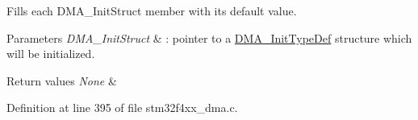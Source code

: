 Fills each D\-M\-A\-\_\-\-Init\-Struct member with its default value. 


\begin{DoxyParams}{Parameters}
{\em D\-M\-A\-\_\-\-Init\-Struct} & \-: pointer to a \hyperlink{struct_d_m_a___init_type_def}{D\-M\-A\-\_\-\-Init\-Type\-Def} structure which will be initialized. \\
\hline
\end{DoxyParams}

\begin{DoxyRetVals}{Return values}
{\em None} & \\
\hline
\end{DoxyRetVals}


Definition at line 395 of file stm32f4xx\-\_\-dma.\-c.

